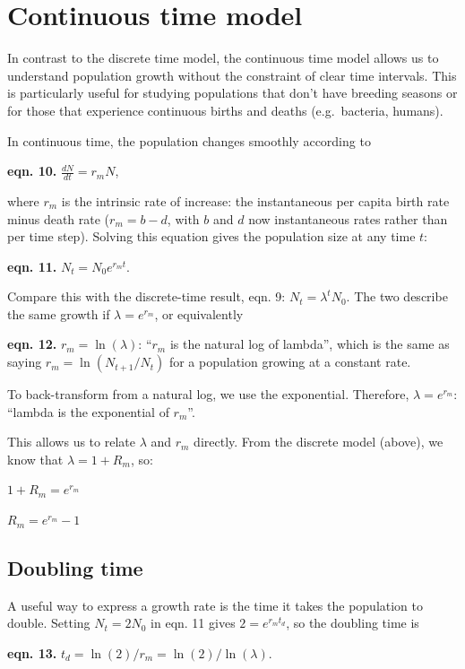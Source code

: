\documentclass[
  a4paper]{book}
\begin{document}
\section{Continuous time model}\label{continuous-time-model}

In contrast to the discrete time model, the continuous time model allows us to understand population growth without the constraint of clear time intervals. This is particularly useful for studying populations that don't have breeding seasons or for those that experience continuous births and deaths (e.g.~bacteria, humans).

In continuous time, the population changes smoothly according to

\textbf{eqn. 10.} \(\frac{dN}{dt} = r_m N\),

where \(r_m\) is the intrinsic rate of increase: the instantaneous per capita birth rate minus death rate (\(r_m = b - d\), with \(b\) and \(d\) now instantaneous rates rather than per time step). Solving this equation gives the population size at any time \(t\):

\textbf{eqn. 11.} \(N_t = N_0 e^{r_m t}\).

Compare this with the discrete-time result, eqn. 9: \(N_t = \lambda^t N_0\). The two describe the same growth if \(\lambda = e^{r_m}\), or equivalently

\textbf{eqn. 12.} \(r_m = \ln(\lambda)\): ``\(r_m\) is the natural log of lambda'', which is the same as saying \(r_m = \ln(N_{t+1}/N_t)\) for a population growing at a constant rate.

To back-transform from a natural log, we use the exponential. Therefore, \(\lambda = e^{r_m}\): ``lambda is the exponential of \(r_m\)''.

This allows us to relate \(\lambda\) and \(r_m\) directly. From the discrete model (above), we know that \(\lambda = 1 + R_m\), so:

\(1 + R_m = e^{r_m}\)

\(R_m = e^{r_m} - 1\)

\subsection{Doubling time}\label{doubling-time}

A useful way to express a growth rate is the time it takes the population to double. Setting \(N_t = 2N_0\) in eqn. 11 gives \(2 = e^{r_m t_d}\), so the doubling time is

\textbf{eqn. 13.} \(t_d = \ln(2)/r_m = \ln(2)/\ln(\lambda)\).
\end{document}
